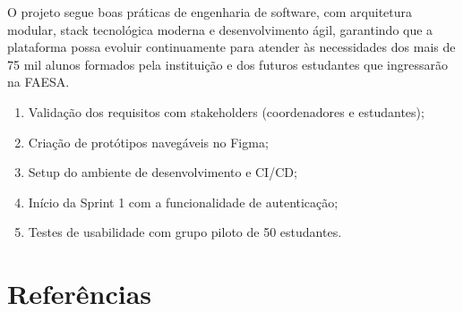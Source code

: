 \documentclass[12pt, a4paper]{article}
\begin{document}
O projeto segue boas práticas de engenharia de software, com arquitetura modular, stack tecnológica moderna e desenvolvimento ágil, garantindo que a plataforma possa evoluir continuamente para atender às necessidades dos mais de 75 mil alunos formados pela instituição e dos futuros estudantes que ingressarão na FAESA.

\begin{destaque}
\begin{enumerate}
    \item Validação dos requisitos com stakeholders (coordenadores e estudantes);
    \item Criação de protótipos navegáveis no Figma;
    \item Setup do ambiente de desenvolvimento e CI/CD;
    \item Início da Sprint 1 com a funcionalidade de autenticação;
    \item Testes de usabilidade com grupo piloto de 50 estudantes.
\end{enumerate}
\end{destaque}

\newpage
\section{Referências}
\end{document}
